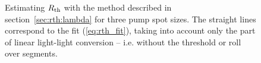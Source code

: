 \begin{figure}
\centering
{}
\caption{Estimating $R_\mathrm{th}$ with
the method described in section~\ref{sec:rth:lambda}
for three pump spot sizes.
The straight lines correspond
to the fit (\ref{eq:rth_fit}),
taking into account
only the part of linear light-light conversion --
i.e. without the threshold
or roll over segments.}
\label{img:Rth_lambda_spot_scaling}
\end{figure}



